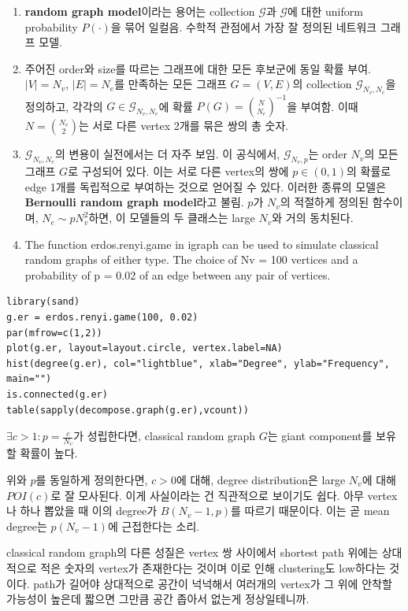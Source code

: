 \documentclass[
]{book}
\begin{document}
{{{\begin{enumerate}
\def\labelenumi{\arabic{enumi}.}
\item
  \textbf{random graph model}이라는 용어는 collection \(\mathcal G\)과 \(\mathcal G\)에 대한 uniform probability \(P(\cdot)\)을 묶어 일컬음. 수학적 관점에서 가장 잘 정의된 네트워크 그래프 모델.
\item
  주어진 order와 size를 따르는 그래프에 대한 모든 후보군에 동일 확률 부여. \(|V|=N_v\), \(|E| = N_e\)를 만족하는 모든 그래프 \(G=(V,E)\)의 collection \(\mathcal G_{N_v, N_e}\)을 정의하고, 각각의 \(G \in \mathcal G_{N_v, N_e}\)에 확률 \(P(G) = {N \choose N_e}^{-1}\)을 부여함. 이때 \(N= {N_v \choose 2}\)는 서로 다른 vertex 2개를 묶은 쌍의 총 숫자.
\item
  \(\mathcal G_{N_v, N_e}\)의 변용이 실전에서는 더 자주 보임. 이 공식에서, \(\mathcal G_{N_v, p}\)는 order \(N_v\)의 모든 그래프 \(G\)로 구성되어 있다. 이는 서로 다른 vertex의 쌍에 \(p \in (0,1)\)의 확률로 edge 1개를 독립적으로 부여하는 것으로 얻어질 수 있다. 이러한 종류의 모델은 \textbf{Bernoulli random graph model}라고 불림. \(p\)가 \(N_v\)의 적절하게 정의된 함수이며, \(N_e \sim p N_v^2\)하면, 이 모델들의 두 클래스는 large \(N_v\)와 거의 동치된다.
\item
  The function erdos.renyi.game in igraph can be used to simulate classical random graphs of either type. The choice of Nv = 100 vertices and a probability of p = 0.02 of an edge between any pair of vertices.
\end{enumerate}

\begin{verbatim}
library(sand)
g.er = erdos.renyi.game(100, 0.02)
par(mfrow=c(1,2))
plot(g.er, layout=layout.circle, vertex.label=NA)
hist(degree(g.er), col="lightblue", xlab="Degree", ylab="Frequency", main="")
is.connected(g.er)
table(sapply(decompose.graph(g.er),vcount))
\end{verbatim}

\(\exists c>1:p = \frac{c}{N_v}\)가 성립한다면, classical random graph \(G\)는 giant component를 보유할 확률이 높다.

위와 \(p\)를 동일하게 정의한다면, \(c>0\)에 대해, degree distribution은 large \(N_v\)에 대해 \(POI(c)\)로 잘 모사된다. 이게 사실이라는 건 직관적으로 보이기도 쉽다. 아무 vertex나 하나 뽑았을 때 이의 degree가 \(B(N_v-1, p)\)를 따르기 때문이다. 이는 곧 mean degree는 \(p(N_v-1)\)에 근접한다는 소리.

classical random graph의 다른 성질은 vertex 쌍 사이에서 shortest path 위에는 상대적으로 적은 숫자의 vertex가 존재한다는 것이며 이로 인해 clustering도 low하다는 것이다. path가 길어야 상대적으로 공간이 넉넉해서 여러개의 vertex가 그 위에 안착할 가능성이 높은데 짧으면 그만큼 공간 좁아서 없는게 정상일테니까.

}}}
\end{document}
